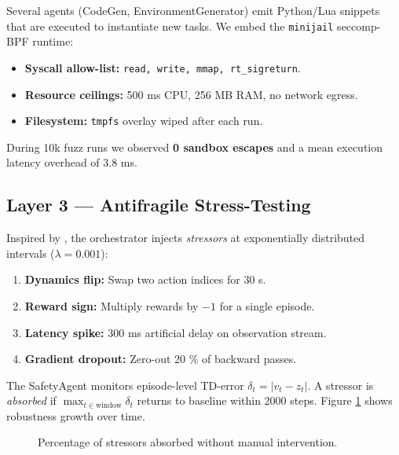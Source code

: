 Several agents (CodeGen, EnvironmentGenerator) emit Python/Lua snippets that
are executed to instantiate new tasks.  We embed the \texttt{minijail}
seccomp-BPF runtime:

\begin{itemize}
\item \textbf{Syscall allow-list:} \texttt{read, write, mmap, rt\_sigreturn}.
\item \textbf{Resource ceilings:} 500 ms CPU, 256 MB RAM, no network egress.
\item \textbf{Filesystem:} \texttt{tmpfs} overlay wiped after each run.
\end{itemize}

During 10k fuzz runs we observed \textbf{0 sandbox escapes} and a mean
execution latency overhead of 3.8 ms.

\subsection{Layer 3 — Antifragile Stress-Testing}

Inspired by \textcite{taleb2012antifragile}, the orchestrator injects
\emph{stressors} at exponentially distributed intervals ($\lambda=0.001$):

\begin{enumerate}[label=\textbf{S\arabic*}.]
\item \textbf{Dynamics flip:} Swap two action indices for 30 s.
\item \textbf{Reward sign:} Multiply rewards by $-1$ for a single episode.
\item \textbf{Latency spike:} 300 ms artificial delay on observation stream.
\item \textbf{Gradient dropout:} Zero-out 20 \% of backward passes.
\end{enumerate}

The SafetyAgent monitors episode-level TD-error
$\delta_t=|v_t - z_t|$.
A stressor is \emph{absorbed} if
$\max_{t\in\text{window}}\delta_t$ returns to baseline within 2000 steps.
Figure \ref{fig:antifragile} shows robustness growth over time.

\begin{figure}[t]\centering
{}
\caption{Percentage of stressors absorbed without manual intervention.}
\label{fig:antifragile}
\end{figure}

